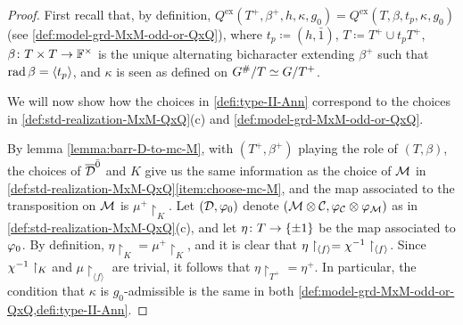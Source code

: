 \begin{proof}
    First recall that, by definition, $Q^{\mathrm{ex}}(T^+, \beta^+, h, \kappa, g_0) = Q^{\mathrm{ex}} (T, \beta, t_p, \kappa, g_0)$ (see \cref{def:model-grd-MxM-odd-or-QxQ}), where $t_p \coloneqq (h, \bar 1)$, $T \coloneqq T^+ \cup t_p T^+$, $\beta\colon T\times T \to \mathbb{F}^\times$ is the unique alternating bicharacter extending $\beta^+$ such that $\operatorname{rad} \beta = \langle t_p \rangle$, and $\kappa$ is seen as defined on $G^\#/T \simeq G/ T^+$. 
    
    We will now show how the choices in \cref{defi:type-II-Ann} correspond to the choices in \cref{def:std-realization-MxM-QxQ}(c) and \cref{def:model-grd-MxM-odd-or-QxQ}. 
    
    By lemma \cref{lemma:barr-D-to-mc-M}, with $(T^+, \beta^+)$ playing the role of $(T, \beta)$, the choices of $\barr \D\even$ and $K$ give us the same information as the choice of $\mathcal M$ in \cref{def:std-realization-MxM-QxQ}\eqref{item:choose-mc-M}, and the map associated to the transposition on $\mathcal M$ is $\mu^+\restriction_K$. 
    Let $(\mathcal{D}, \varphi_0)$ denote $(\mathcal M \otimes \mathcal C, \varphi_{\mathcal C} \otimes \varphi_{\mathcal M})$ as in \cref{def:std-realization-MxM-QxQ}(c), and let
    $\eta\colon T \to \{ \pm 1 \}$ be the map associated to $\varphi_0$.  
    By definition, $\eta\restriction_{K} = \mu^+\restriction_K$, and it is clear that $\eta\restriction_{\langle f \rangle} = \chi^{-1}\restriction_{\langle f \rangle}$. 
    Since $\chi^{-1}\restriction_K$ and $\mu\restriction_{\langle f \rangle}$ are trivial, it follows that $\eta\restriction_{T^+} = \eta^+$. 
    In particular, the condition that $\kappa$ is $g_0$-admissible is the same in both \cref{def:model-grd-MxM-odd-or-QxQ,defi:type-II-Ann}.
    

\end{proof}
